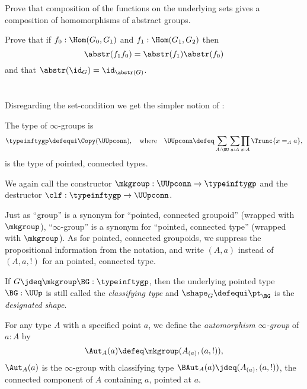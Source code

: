 \begin{xca}
Prove that composition of the functions on the underlying sets gives a composition of homomorphisms of abstract groups.

  Prove that if $f_0:\Hom(G_0,G_1)$ and $f_1:\Hom(G_1,G_2)$ then
$$\abstr(f_1f_0)=\abstr(f_1)\abstr(f_0)$$ and that $\abstr(\id_G)=\id_{\abstr(G)}$.
\end{xca}



\section{\texorpdfstring{\inftygps}{∞-groups}}
\label{sec:inftygps}

Disregarding the set-condition we get the simpler notion of \inftygps:
\begin{definition}\label{def:inftygps}
  The type of $\infty$-groups is
  \[
    \typeinftygp\defequi \Copy(\UUpconn),
    \quad\text{where}\quad
    \UUpconn\defeq \sum_{A:\UU}\sum_{a:A}\prod_{x:A}\Trunc{x=_Aa},
  \]
  is the type of pointed, connected types.

  We again call the constructor $\mkgroup : \UUpconn \to \typeinftygp$
  and the destructor $\clf : \typeinftygp \to \UUpconn$.
\end{definition}

\begin{remark}\label{rem:pointedtypes}
  Just as ``group'' is a synonym for ``pointed, connected groupoid''
  (wrapped with $\mkgroup$),
  ``$\infty$-group'' is a synonym for ``pointed, connected type''
  (wrapped with $\mkgroup$).
  As for pointed, connected groupoids,
  we suppress the propositional information from the notation,
  and write $(A,a)$ instead of $(A,a,!)$ for an pointed, connected type.
\end{remark}

\begin{definition}\label{def:classifyingspace}
  If $G \jdeq \mkgroup\BG:\typeinftygp$,
  then the underlying pointed type $\BG : \UUp$
  is still called the  \emph{classifying type} and $\shape_G\defequi \pt_{\BG}$
  is the \emph{designated shape}.
\end{definition}

\begin{definition}
  For any type $A$ with a specified point $a$,
  we define the \emph{automorphism $\infty$-group} of $a:A$ by
  \[
    \Aut_A(a) \defeq \mkgroup (A_{(a)},(a,!)),
  \]
  \ie $\Aut_A(a)$ is the $\infty$-group with classifying type
  $\BAut_A(a) \jdeq (A_{(a)},(a,!))$,
  the connected component of $A$ containing $a$, pointed at $a$.
\end{definition}

